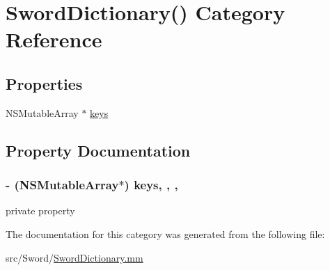 \hypertarget{category_sword_dictionary_07_08}{\section{Sword\-Dictionary() Category Reference}
\label{category_sword_dictionary_07_08}
}
\subsection*{Properties}
\begin{DoxyCompactItemize}
\item 
N\-S\-Mutable\-Array $\ast$ \hyperlink{category_sword_dictionary_07_08_a55ba70453314bdf10337607cfe31279b}{keys}
\end{DoxyCompactItemize}


\subsection{Property Documentation}
\hypertarget{category_sword_dictionary_07_08_a55ba70453314bdf10337607cfe31279b}{
\subsubsection[{keys}]{\setlength{\rightskip}{0pt plus 5cm}-\/ (N\-S\-Mutable\-Array$\ast$) keys\hspace{0.3cm}{\ttfamily [read]}, {\ttfamily [write]}, {\ttfamily [atomic]}, {\ttfamily [retain]}}}\label{category_sword_dictionary_07_08_a55ba70453314bdf10337607cfe31279b}
private property 

The documentation for this category was generated from the following file\-:\begin{DoxyCompactItemize}
\item 
src/\-Sword/\hyperlink{_sword_dictionary_8mm}{Sword\-Dictionary.\-mm}\end{DoxyCompactItemize}
